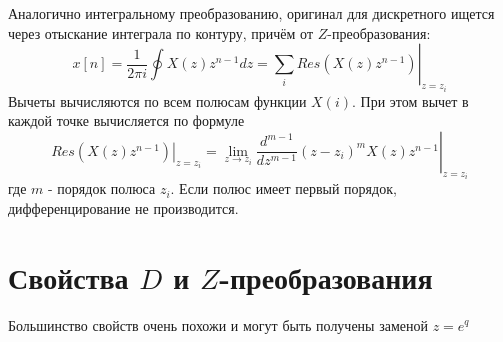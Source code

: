 \documentclass[12pt,twoside]{report}
\theoremstyle{MyNonumberplain}
\begin{document}
            Аналогично интегральному преобразованию, оригинал для дискретного ищется через отыскание  интеграла по контуру,
            причём от $Z$-преобразования:
            \begin{equation}
                x[n]=\frac{1}{2\pi i}\oint X(z)z^{n-1}dz=\left.\sum_i Res(X(z)z^{n-1})\right|_{z=z_i}
            \end{equation}
            Вычеты вычисляются по всем полюсам функции $X(i)$. При этом вычет в каждой точке вычисляется по формуле
            \begin{equation}
                \left.Res(X(z)z^{n-1})\right|_{z=z_i}=\left.\lim_{z\to z_i} \frac{d^{m-1}}{dz^{m-1}}(z-z_i)^m X(z)z^{n-1}\right|_{z=z_i}
            \end{equation}
            где $m$ - порядок полюса $z_i$. Если полюс имеет первый порядок, дифференцирование не производится.\\
    
        \section{Свойства $D$ и $Z$-преобразования}
            Большинство свойств очень похожи и могут быть получены заменой $z=e^q$\\
\end{document}
